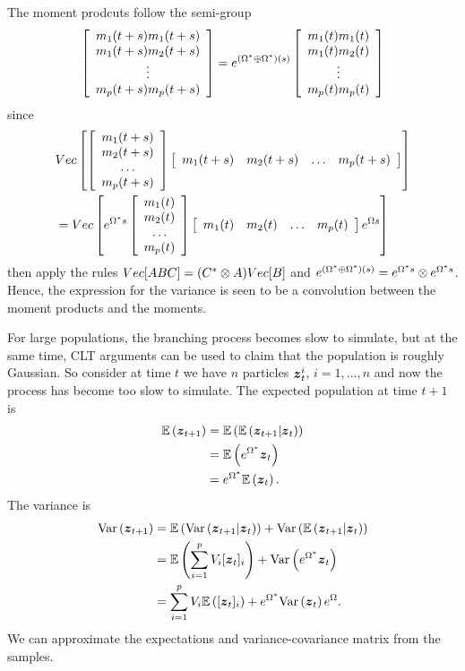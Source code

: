 \documentclass{article}
\begin{document}
The moment prodcuts follow the semi-group
\[
    \Matrix{c}{m_1(t+s)m_1(t+s)\\m_1(t+s)m_2(t+s)\\\vdots\\m_p(t+s)m_p(t+s)} = \Exp{(\Omega\tr\oplus\Omega\tr)(s)}\Matrix{c}{m_1(t)m_1(t)\\m_1(t)m_2(t)\\\vdots\\m_p(t)m_p(t)}
\]
since 
\begin{align}
    &Vec\left[\Matrix{c}{m_1(t+s)\\m_2(t+s)\\\hdots\\m_p(t+s)}\Matrix{cccc}{m_1(t+s)&m_2(t+s)&\hdots&m_p(t+s)}\right]
    \\&=Vec\left[\Exp{\Omega\tr s}\Matrix{c}{m_1(t)\\m_2(t)\\\hdots\\m_p(t)}\Matrix{cccc}{m_1(t)&m_2(t)&\hdots&m_p(t)}\Exp{\Omega s}\right]
\end{align}
then apply the rules \(Vec[ABC]=(C\tr\otimes A)Vec[B]\) and \(\Exp{(\Omega\tr\oplus\Omega\tr)(s)}=\Exp{\Omega\tr s}\otimes \Exp{\Omega\tr s}\).
Hence, the expression for the variance is seen to be a convolution between the moment products and the moments.

For large populations, the branching process becomes slow to simulate, but at the same time, CLT arguments can be used to claim that the population is roughly Gaussian. So consider at time \(t\) we have \(n\) particles \(\bs z_t^{i}\), \(i=1,...,n\) and now the process has become too slow to simulate. The expected population at time \(t+1\) is 
\begin{align}
    \Ex{\bs z_{t+1}} &= \Ex{\Ex{\bs z_{t+1}|\bs z_t}}
    \\&=\Ex{\Exp{\Omega\tr}\bs z_t}
    \\&=\Exp{\Omega\tr}\Ex{\bs z_t}.
\end{align}
The variance is 
\begin{align}
    \Var{\bs z_{t+1}} &= \Ex{\Var{\bs z_{t+1}|\bs z_t}} + \Var{\Ex{\bs z_{t+1}|\bs z_t}}
    \\&=\Ex{\sum_{i=1}^pV_i[\bs z_t]_i} + \Var{\Exp{\Omega\tr}\bs z_t}
    \\&=\sum_{i=1}^pV_i\Ex{[\bs z_t]_i} + \Exp{\Omega\tr}\Var{\bs z_t}\Exp{\Omega}.
\end{align}
We can approximate the expectations and variance-covariance matrix from the samples. 
\end{document}
